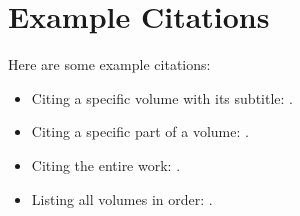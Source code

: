 \documentclass{article}
\begin{document}
\section*{Example Citations}

Here are some example citations:

\begin{itemize}
    \item Citing a specific volume with its subtitle: \cite{smith2023vol1}.
    \item Citing a specific part of a volume: \cite{smith2023vol4part1}.
    \item Citing the entire work: \cite{smith2023allvols}.
    \item Listing all volumes in order: \cites[Vol. I]{smith2023vol1}[Vol. II]{smith2023vol2}[Vol. III]{smith2023vol3}[Vol. IV, Part 1]{smith2023vol4part1}[Vol. IV, Part 2]{smith2023vol4part2}[Vol. V]{smith2023vol5}[Vol. VI]{smith2023vol6}[Vol. VII]{smith2023vol7}.
\end{itemize}

\printbibliography
\end{document}
